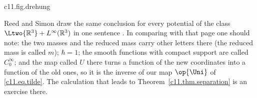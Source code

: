 \begin{fundament}
  \begin{tpcfigure}{c11.fig.drehung}
    \caption{Step 2 of the proof for one direction of space, drawn for $\massP : \massE = 3 : 1$. In the plane of the scaled coordinates $x_{\mathrm{e}}$, $x_{\mathrm{p}}$, $z$ is the coordinate along the unit vector with the components $\sqrt{\massP/\massTot}$ and $-\sqrt{\massE/\massTot}$. This direction and the one perpendicular to it form a rotated pair of axes; the circle is the unit circle.}
  \end{tpcfigure}

  Reed and Simon draw the same conclusion for every potential of the class
  $\Ltwo{\mathbb{R}^3} + L^{\infty}(\mathbb{R}^3)$ in one sentence
  . In comparing with that page one should note: the
  two masses and the reduced mass carry other letters there (the reduced mass is called
  $m$); $\hbar = 1$; the smooth functions with compact support are called
  $C_0^{\infty}$; and the map called $U$ there turns a function of the new coordinates
  into a function of the old ones, so it is the inverse of our map $\op{\Uni}$ of
  \eqref{c11.eq.tilde}. The calculation that leads to
  Theorem~\ref{c11.thm.separation} is an exercise there.
\end{fundament}

